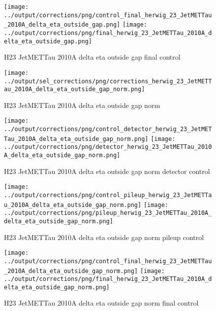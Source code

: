 \documentclass[11pt]{book}
\begin{document}
\begin{figure}[ht]
\centering
\texttt{[image: ../output/corrections/png/control\_final\_herwig\_23\_JetMETTau\_2010A\_delta\_eta\_outside\_gap.png]}
\texttt{[image: ../output/corrections/png/final\_herwig\_23\_JetMETTau\_2010A\_delta\_eta\_outside\_gap.png]}
\caption{H23 JetMETTau 2010A delta eta outside gap final control}
\label{fig:H23_JetMETTau_2010A_delta_eta_outside_gap_final_control}
\end{figure}



\begin{figure}[ht]
\centering
\texttt{[image: ../output/sel\_corrections/png/corrections\_herwig\_23\_JetMETTau\_2010A\_delta\_eta\_outside\_gap\_norm.png]}
\caption{H23 JetMETTau 2010A delta eta outside gap norm}
\label{fig:H23_JetMETTau_2010A_delta_eta_outside_gap_norm}
\end{figure}

\begin{figure}[ht]
\centering
\texttt{[image: ../output/corrections/png/control\_detector\_herwig\_23\_JetMETTau\_2010A\_delta\_eta\_outside\_gap\_norm.png]}
\texttt{[image: ../output/corrections/png/detector\_herwig\_23\_JetMETTau\_2010A\_delta\_eta\_outside\_gap\_norm.png]}
\caption{H23 JetMETTau 2010A delta eta outside gap norm detector control}
\label{fig:H23_JetMETTau_2010A_delta_eta_outside_gap_norm_detector_control}
\end{figure}

\begin{figure}[ht]
\centering
\texttt{[image: ../output/corrections/png/control\_pileup\_herwig\_23\_JetMETTau\_2010A\_delta\_eta\_outside\_gap\_norm.png]}
\texttt{[image: ../output/corrections/png/pileup\_herwig\_23\_JetMETTau\_2010A\_delta\_eta\_outside\_gap\_norm.png]}
\caption{H23 JetMETTau 2010A delta eta outside gap norm pileup control}
\label{fig:H23_JetMETTau_2010A_delta_eta_outside_gap_norm_pileup_control}
\end{figure}


\begin{figure}[ht]
\centering
\texttt{[image: ../output/corrections/png/control\_final\_herwig\_23\_JetMETTau\_2010A\_delta\_eta\_outside\_gap\_norm.png]}
\texttt{[image: ../output/corrections/png/final\_herwig\_23\_JetMETTau\_2010A\_delta\_eta\_outside\_gap\_norm.png]}
\caption{H23 JetMETTau 2010A delta eta outside gap norm final control}
\label{fig:H23_JetMETTau_2010A_delta_eta_outside_gap_norm_final_control}
\end{figure}
\cleardoublepage
\end{document}
